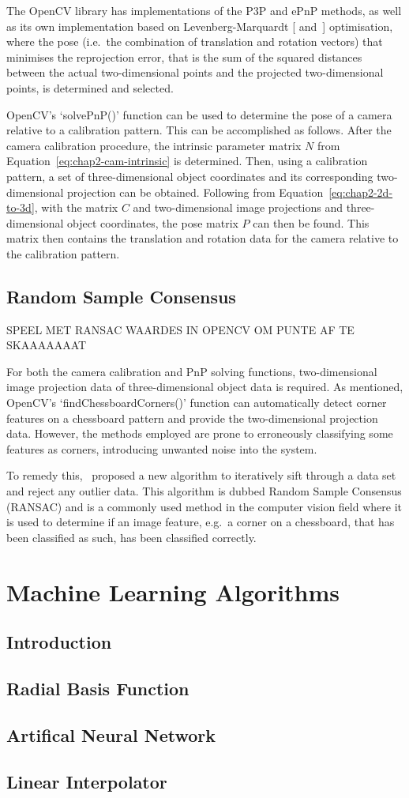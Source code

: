 The OpenCV library has implementations of the P3P and ePnP methods, as well as its own implementation based on Levenberg-Marquardt [\cite{levenberg1944method} and~\cite{marquardt1963algorithm}] optimisation, where the pose (i.e.\ the combination of translation and rotation vectors) that minimises the reprojection error, that is the sum of the squared distances between the actual two-dimensional points and the projected two-dimensional points, is determined and selected. 

OpenCV's `solvePnP()' function can be used to determine the pose of a camera relative to a calibration pattern. This can be accomplished as follows. After the camera calibration procedure, the intrinsic parameter matrix $N$ from Equation~\ref{eq:chap2-cam-intrinsic} is determined. Then, using a calibration pattern, a set of three-dimensional object coordinates and its corresponding two-dimensional projection can be obtained. Following from Equation~\ref{eq:chap2-2d-to-3d}, with the matrix $C$ and two-dimensional image projections and three-dimensional object coordinates, the pose matrix $P$ can then be found. This matrix then contains the translation and rotation data for the camera relative to the calibration pattern. 

\subsection{Random Sample Consensus}

SPEEL MET RANSAC WAARDES IN OPENCV OM PUNTE AF TE SKAAAAAAAT

For both the camera calibration and PnP solving functions, two-dimensional image projection data of three-dimensional object data is required. As mentioned, OpenCV's `findChessboardCorners()' function can automatically detect corner features on a chessboard pattern and provide the two-dimensional projection data. However, the methods employed are prone to erroneously classifying some features as corners, introducing unwanted noise into the system. 

To remedy this,~\cite{fischler1981random} proposed a new algorithm to iteratively sift through a data set and reject any outlier data. This algorithm is dubbed Random Sample Consensus (RANSAC) and is a commonly used method in the computer vision field where it is used to determine if an image feature, e.g.\ a corner on a chessboard, that has been classified as such, has been classified correctly. 

\section{Machine Learning Algorithms}

\subsection{Introduction}

\subsection{Radial Basis Function}

\subsection{Artifical Neural Network}

\subsection{Linear Interpolator}
